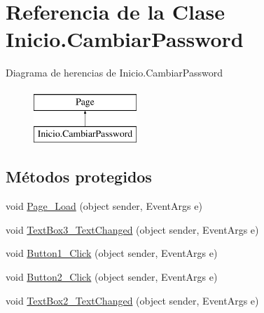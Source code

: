 \hypertarget{classInicio_1_1CambiarPassword}{}\section{Referencia de la Clase Inicio.\+Cambiar\+Password}
\label{classInicio_1_1CambiarPassword}
Diagrama de herencias de Inicio.\+Cambiar\+Password\begin{figure}[H]
\begin{center}
\leavevmode
\includegraphics[height=2.000000cm]{classInicio_1_1CambiarPassword}
\end{center}
\end{figure}
\subsection*{Métodos protegidos}
\begin{DoxyCompactItemize}
\item 
void \mbox{\hyperlink{classInicio_1_1CambiarPassword_a94a3066835d069fa7b90f66f6f526ac3}{Page\+\_\+\+Load}} (object sender, Event\+Args e)
\item 
void \mbox{\hyperlink{classInicio_1_1CambiarPassword_a51ae5ea82fb81cd914f095420908a5e4}{Text\+Box3\+\_\+\+Text\+Changed}} (object sender, Event\+Args e)
\item 
void \mbox{\hyperlink{classInicio_1_1CambiarPassword_a59bb43a3c0865c4c403c30cf49bc5381}{Button1\+\_\+\+Click}} (object sender, Event\+Args e)
\item 
void \mbox{\hyperlink{classInicio_1_1CambiarPassword_aec4c171949c854275a9dd38e949cb62e}{Button2\+\_\+\+Click}} (object sender, Event\+Args e)
\item 
void \mbox{\hyperlink{classInicio_1_1CambiarPassword_abfdeff9b67fcd55ac193f7e51ddbbeb6}{Text\+Box2\+\_\+\+Text\+Changed}} (object sender, Event\+Args e)
\end{DoxyCompactItemize}
